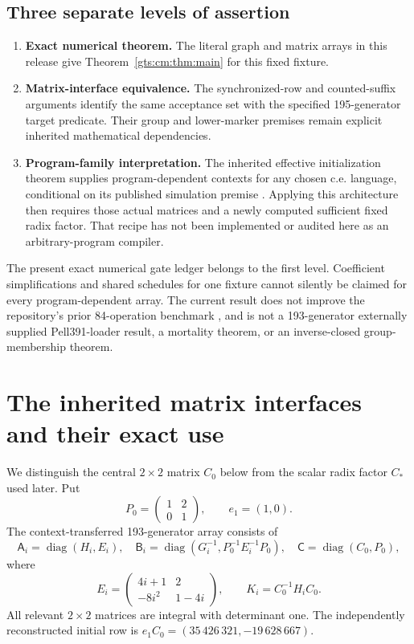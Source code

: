 \documentclass[11pt,letterpaper]{article}
\theoremstyle{definition}
\theoremstyle{remark}
\newcommand{\diag}{\operatorname{diag}}
\begin{document}
\subsection{Three separate levels of assertion}
\begin{enumerate}
\item \textbf{Exact numerical theorem.} The literal graph and matrix arrays in this release give Theorem~\ref{gts:cm:thm:main} for this fixed fixture.
\item \textbf{Matrix-interface equivalence.} The synchronized-row and counted-suffix arguments identify the same acceptance set with the specified 195-generator target predicate. Their group and lower-marker premises remain explicit inherited mathematical dependencies.
\item \textbf{Program-family interpretation.} The inherited effective initialization theorem supplies program-dependent contexts for any chosen c.e. language, conditional on its published simulation premise \cite{cm-unary,cm-nearywoods}. Applying this architecture then requires those actual matrices and a newly computed sufficient fixed radix factor. That recipe has not been implemented or audited here as an arbitrary-program compiler.
\end{enumerate}
The present exact numerical gate ledger belongs to the first level. Coefficient simplifications and shared schedules for one fixture cannot silently be claimed for every program-dependent array. The current result does not improve the repository's prior 84-operation benchmark \cite{cm-gamma}, and is not a 193-generator externally supplied Pell391-loader result, a mortality theorem, or an inverse-closed group-membership theorem.

\section{The inherited matrix interfaces and their exact use}
\label{gts:cm:sec:matrix}
We distinguish the central $2\times2$ matrix $C_0$ below from the scalar radix factor $C_*$ used later. Put
\[
 P_0=\begin{pmatrix}1&2\\0&1\end{pmatrix},\qquad e_1=(1,0).
\]
The context-transferred 193-generator array consists of
\begin{equation}\label{gts:cm:eq:old}
 \mathsf A_i=\diag(H_i,E_i),\quad
 \mathsf B_i=\diag(G_i^{-1},P_0^{-1}E_i^{-1}P_0),\quad
 \mathsf C=\diag(C_0,P_0),
\end{equation}
where
\[
 E_i=\begin{pmatrix}4i+1&2\\-8i^2&1-4i\end{pmatrix},\qquad
 K_i=C_0^{-1}H_iC_0.
\]
All relevant $2\times2$ matrices are integral with determinant one. The independently reconstructed initial row is $e_1C_0=(35\,426\,321,-19\,628\,667)$.
\end{document}
